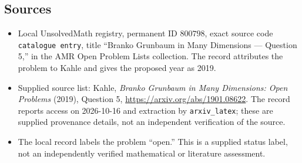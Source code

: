\documentclass[11pt]{article}
\begin{document}
\subsection{Sources}
\begin{itemize}
\item Local UnsolvedMath registry, permanent ID \(800798\), exact source code \texttt{catalogue entry}, title ``Branko Grunbaum in Many Dimensions --- Question 5,'' in the AMR Open Problem Lists collection. The record attributes the problem to Kahle and gives the proposed year as 2019.
\item Supplied source list: Kahle, \emph{Branko Grunbaum in Many Dimensions: Open Problems} (2019), Question 5, \url{https://arxiv.org/abs/1901.08622}. The record reports access on 2026-10-16 and extraction by \texttt{arxiv\_latex}; these are supplied provenance details, not an independent verification of the source.
\item The local record labels the problem ``open.'' This is a supplied status label, not an independently verified mathematical or literature assessment.
\end{itemize}
\end{document}
